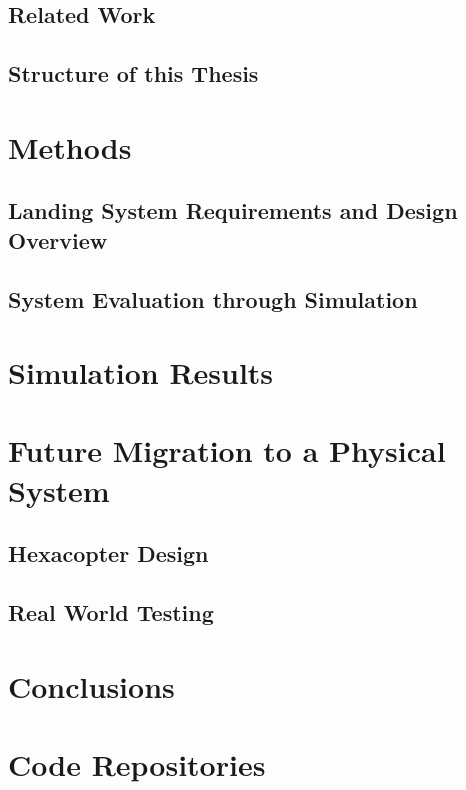\documentclass[11pt,letterpaper,oneside]{book}
\begin{document}
\section{Related Work}


\section{Structure of this Thesis}


\chapter{Methods}
\section{Landing System Requirements and Design Overview}


\section{System Evaluation through Simulation}


\chapter{Simulation Results}
\label{chapter:simulation_results}


\chapter{Future Migration to a Physical System}
\section{Hexacopter Design}


\section{Real World Testing}


\chapter{Conclusions}


\appendix
\chapter{Code Repositories}


% 


\end{document}
